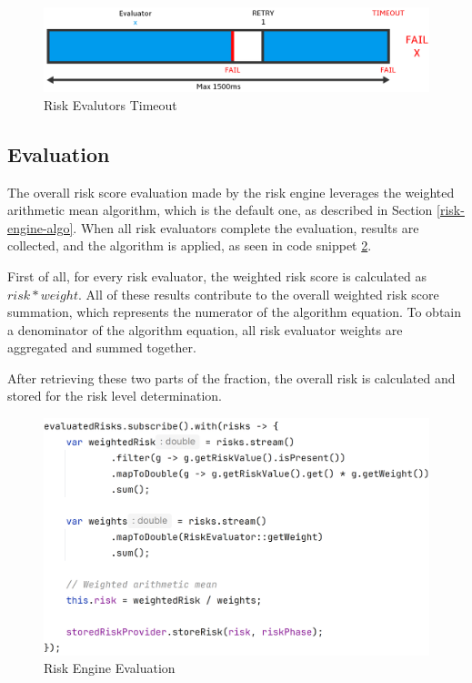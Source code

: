 \begin{figure}[htbp]
  \centering
  \includegraphics[width=1\textwidth]{img/sections/6-implementation/async-timeout.png}
  \caption{Risk Evalutors Timeout}
  \label{fig:impl-risk-engine-timeout}
\end{figure}

\newpage

\subsection{Evaluation} \label{impl-engine-evaluation}
The overall risk score evaluation made by the risk engine leverages the weighted arithmetic mean algorithm, which is the default one, as described in Section \ref{risk-engine-algo}.
When all risk evaluators complete the evaluation, results are collected, and the algorithm is applied, as seen in code snippet \ref{fig:impl-risk-engine-evaluation}.

First of all, for every risk evaluator, the weighted risk score is calculated as \( risk * weight \).
All of these results contribute to the overall weighted risk score summation, which represents the numerator of the algorithm equation.
To obtain a denominator of the algorithm equation, all risk evaluator weights are aggregated and summed together.

After retrieving these two parts of the fraction, the overall risk is calculated and stored for the risk level determination. 

\begin{figure}[htbp]
  \centering
  \includegraphics[width=1\textwidth]{img/sections/6-implementation/risk-engine-evaluation.png}
  \caption{Risk Engine Evaluation}
  \label{fig:impl-risk-engine-evaluation}
\end{figure}

